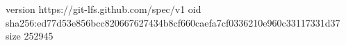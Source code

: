 version https://git-lfs.github.com/spec/v1
oid sha256:ed77d53e856bcc820667627434b8cf660caefa7cf0336210e960c33117331d37
size 252945
